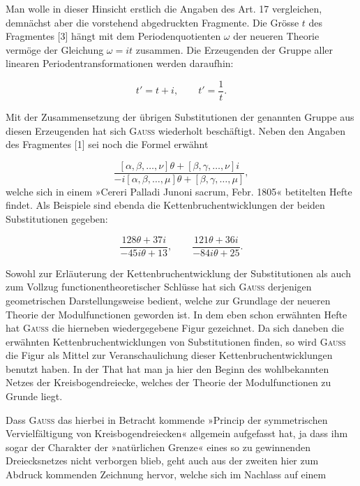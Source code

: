 Man wolle in dieser Hinsicht erstlich die Angaben des Art. 17 vergleichen, demnächst aber die vorstehend abgedruckten Fragmente. Die Grösse $t$ des Fragmentes [3] hängt mit dem Periodenquotienten $\omega$ der neueren Theorie vermöge der Gleichung $\omega = it$ zusammen. Die Erzeugenden der Gruppe aller linearen Periodentransformationen werden daraufhin:

\[
t' = t+i, \qquad t' = \frac1t.
\]

Mit der Zusammensetzung der übrigen Substitutionen der genannten Gruppe aus diesen Erzeugenden hat sich \textsc{Gauss} wiederholt beschäftigt. Neben den Angaben des Fragmentes [1] sei noch die Formel erwähnt

\[
\frac{[\alpha,\beta,\ldots,\nu]\theta+[\beta,\gamma,\ldots,\nu]i}{-i[\alpha,\beta,\ldots,\mu]\theta+[\beta,\gamma,\ldots,\mu]},
\]
welche sich in einem »Cereri Palladi Junoni sacrum, Febr. 1805« betitelten Hefte findet. Als Beispiele sind ebenda die Kettenbruchentwicklungen der beiden Substitutionen gegeben:

\[
\frac{128\theta+37i}{-45i\theta+13}, \qquad \frac{121\theta+36i}{-84i\theta+25}.
\]

Sowohl zur Erläuterung der Kettenbruchentwicklung der Substitutionen als auch zum Vollzug functionentheoretischer Schlüsse hat sich \textsc{Gauss} derjenigen geometrischen Darstellungsweise bedient, welche zur Grundlage der neueren Theorie der Modulfunctionen geworden ist. In dem eben schon erwähnten Hefte hat \textsc{Gauss} die hierneben wiedergegebene Figur gezeichnet. Da sich daneben die erwähnten Kettenbruchentwicklungen von Substitutionen finden, so wird \textsc{Gauss} die Figur als Mittel zur Veranschaulichung dieser Kettenbruchentwicklungen benutzt haben. In der That hat man ja hier den Beginn des wohlbekannten Netzes der Kreisbogendreiecke, welches der Theorie der Modulfunctionen zu Grunde liegt.

\begin{center}\resizebox{9.7cm}{!}{}\end{center}

Dass \textsc{Gauss} das hierbei in Betracht kommende »Princip der symmetrischen Vervielfältigung von Kreisbogendreiecken« allgemein aufgefasst hat, ja dass ihm sogar der Charakter der »natürlichen Grenze« eines so zu gewinnenden Dreiecksnetzes nicht verborgen blieb, geht auch aus der zweiten hier zum Abdruck kommenden Zeichnung hervor, welche sich im Nachlass auf einem

\begin{center}\resizebox{12.3cm}{!}{}\end{center}

